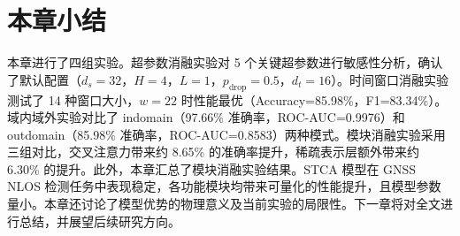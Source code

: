 \section{本章小结}

本章进行了四组实验。超参数消融实验对 5 个关键超参数进行敏感性分析，确认了默认配置（$d_s=32$，$H=4$，$L=1$，$p_\text{drop}=0.5$，$d_t=16$）。时间窗口消融实验测试了 14 种窗口大小，$w=22$ 时性能最优（Accuracy=85.98\%，F1=83.34\%）。域内域外实验对比了 indomain（97.66\% 准确率，ROC-AUC=0.9976）和 outdomain（85.98\% 准确率，ROC-AUC=0.8583）两种模式。模块消融实验采用三组对比，交叉注意力带来约 8.65\% 的准确率提升，稀疏表示层额外带来约 6.30\% 的提升。此外，本章汇总了模块消融实验结果。STCA 模型在 GNSS NLOS 检测任务中表现稳定，各功能模块均带来可量化的性能提升，且模型参数量小。本章还讨论了模型优势的物理意义及当前实验的局限性。下一章将对全文进行总结，并展望后续研究方向。
